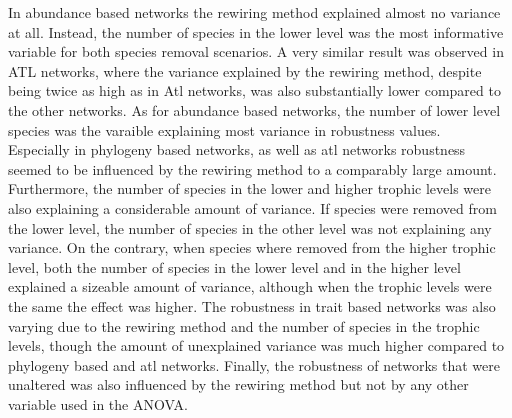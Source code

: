 \documentclass[12pt,a4paper]{article}
\begin{document}
In abundance based networks the rewiring method explained almost no variance at all. Instead, the number of species in the lower level was the most informative variable for both species removal scenarios. A very similar result was observed in ATL networks, where the variance explained by the rewiring method, despite being twice as high as in Atl networks, was also substantially lower compared to the other networks. As for abundance based networks, the number of lower level species was the varaible explaining most variance in robustness values. \\ Especially in phylogeny based networks, as well as atl networks robustness seemed to be influenced by the rewiring method to a comparably large amount. Furthermore, the number of species in the lower and higher trophic levels were also explaining a considerable amount of variance. If species were removed from the lower level, the number of species in the other level was not explaining any variance. On the contrary, when species where removed from the higher trophic level, both the number of species in the lower level and in the higher level explained a sizeable amount of variance, although when the trophic levels were the same the effect was higher. The robustness in trait based networks was also varying due to the rewiring method and the number of species in the trophic levels, though the amount of unexplained variance was much higher compared to phylogeny based and atl networks. Finally, the robustness of networks that were unaltered was also influenced by the rewiring method but not by any other variable used in the ANOVA.
\end{document}
